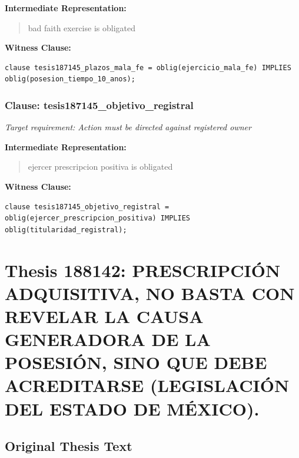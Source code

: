 \documentclass[11pt,a4paper]{article}
\begin{document}
\textbf{Intermediate Representation:}

\begin{quote}
bad faith exercise is obligated
\end{quote}

\textbf{Witness Clause:}

\begin{lstlisting}[style=witnessstyle, language=Witness]
clause tesis187145_plazos_mala_fe = oblig(ejercicio_mala_fe) IMPLIES oblig(posesion_tiempo_10_anos);
\end{lstlisting}

\subsubsection{Clause: tesis187145\_objetivo\_registral}

\textit{Target requirement: Action must be directed against registered owner}

\textbf{Intermediate Representation:}

\begin{quote}
ejercer prescripcion positiva is obligated
\end{quote}

\textbf{Witness Clause:}

\begin{lstlisting}[style=witnessstyle, language=Witness]
clause tesis187145_objetivo_registral = oblig(ejercer_prescripcion_positiva) IMPLIES oblig(titularidad_registral);
\end{lstlisting}

\newpage

\section{Thesis 188142: PRESCRIPCIÓN ADQUISITIVA, NO BASTA CON REVELAR LA CAUSA GENERADORA DE LA POSESIÓN, SINO QUE DEBE ACREDITARSE (LEGISLACIÓN DEL ESTADO DE MÉXICO).}
\label{thesis:188142}

\subsection{Original Thesis Text}
\end{document}
